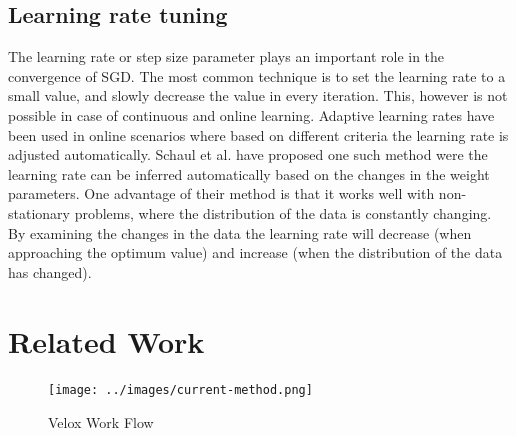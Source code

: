 \documentclass{sig-alternate-05-2015}
\begin{document}
\subsection{Learning rate tuning} \label{learning-rate}
The learning rate or step size parameter plays an important role in the convergence of SGD.
The most common technique is to set the learning rate to a small value, and slowly decrease the value in every iteration. 
This, however is not possible in case of continuous and online learning. 
Adaptive learning rates have been used in online scenarios where based on different criteria the learning rate is adjusted automatically.
Schaul et al. \cite{schaul2013no} have proposed one such method were the learning rate can be inferred automatically based on the changes in the weight parameters. 
One advantage of their method is that it works well with non-stationary problems, where the distribution of the data is constantly changing. 
By examining the changes in the data the learning rate will decrease (when approaching the optimum value) and increase (when the distribution of the data has changed).

\section{Related Work} \label{related-work}

\begin{figure}[t!]
\centering
\texttt{[image: ../images/current-method.png]}
\caption{Velox Work Flow}
\label{fig:velox-work-flow}
\end{figure}
\end{document}

